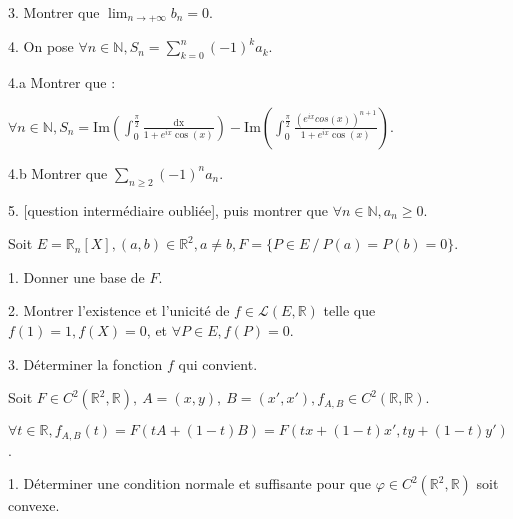 \vspace{5pt}
3. Montrer que $\displaystyle \lim_{n\to+\infty} b_n = 0$.

\vspace{5pt}
4. On pose $\displaystyle \forall n \in \mathbb{N}, S_n = \sum_{k=0}^{n} (-1)^ka_k$.

\vspace{5pt}
\quad 4.a Montrer que :

$\displaystyle \forall n \in \mathbb{N}, S_n =
  \mathrm{Im}\left( \int_{0}^{\frac {\pi} {2}} \frac {\mathrm{dx}} {1+ e^{ix}\cos(x)}\right)
- \mathrm{Im}\left( \int_{0}^{\frac {\pi} {2}} \frac {(e^{ix}cos(x))^{n+1}} {1+ e^{ix}\cos(x)}\right)$.

\vspace{5pt}
\quad 4.b Montrer que $\displaystyle \sum_{n \geqslant 2}^{}(-1)^na_n$.

\vspace{5pt}
5. [question intermédiaire oubliée], puis montrer que $\forall n \in \mathbb{N}, a_n \geqslant 0$.



\subetoiles



\noindent Soit $E = \mathbb{R}_n[X], (a,b) \in \mathbb{R}^2, a \ne b, F = \{P \in E \ /\ P(a) = P(b) = 0\}$.

\vspace{5pt}
1. Donner une base de $F$.

\vspace{5pt}
2. Montrer l'existence et l'unicité de $f \in \mathcal{L}(E, \mathbb{R})$ telle que 
$f(1) = 1, f(X) = 0$, et $\forall P \in E, f(P) = 0$.

\vspace{5pt}
3. Déterminer la fonction $f$ qui convient.



\subetoiles
\columnbreak



\noindent Soit $F \in C^2(\mathbb{R}^2, \mathbb{R}), \ A=(x, y), \ B = (x', x'), f_{A,B} \in C^2(\mathbb{R}, \mathbb{R})$.

\vspace{5pt}
\noindent $\forall t \in \mathbb{R}, f_{A,B}(t) = F(tA + (1-t)B) = F(tx + (1-t)x', ty + (1-t)y')$.

\vspace{5pt}
1. Déterminer une condition normale et suffisante pour que $\varphi \in C^2(\mathbb{R}^2, \mathbb{R})$ soit convexe.

